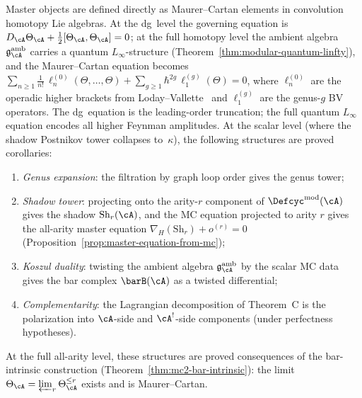 \begin{remark}
\label{rem:chriss-ginzburg-philosophy}
Master objects are defined directly as
Maurer--Cartan elements in convolution homotopy Lie algebras.  At
the dg~level the governing equation is
$D_{\cA}\Theta_{\cA} + \tfrac12[\Theta_{\cA},\Theta_{\cA}] = 0$;
at the full homotopy level the ambient algebra
$\mathfrak{g}_\cA^{\mathrm{amb}}$ carries a quantum
$L_\infty$-structure
(Theorem~\ref{thm:modular-quantum-linfty}), and the
Maurer--Cartan equation becomes
$\sum_{n \geq 1}\tfrac{1}{n!}\,\ell_n^{(0)}(\Theta,\dots,\Theta)
+ \sum_{g \geq 1}\hbar^{2g}\,\ell_1^{(g)}(\Theta) = 0$,
where $\ell_n^{(0)}$ are the operadic higher brackets from
Loday--Vallette~\cite[Thm~10.3.8]{LV12} and $\ell_1^{(g)}$ are
the genus-$g$ BV operators.  The dg~equation is the leading-order
truncation; the full quantum $L_\infty$ equation encodes all
higher Feynman amplitudes.
At the scalar level (where the shadow Postnikov tower
collapses to~$\kappa$), the following structures are
proved corollaries:
\begin{enumerate}[label=\textup{(\roman*)}]
\item \emph{Genus expansion}: the filtration by graph loop order gives the genus tower;
\item \emph{Shadow tower}: projecting onto the arity-$r$ component of $\Defcyc^{\mathrm{mod}}(\cA)$ gives the shadow $\mathrm{Sh}_r(\cA)$, and the MC equation projected to arity $r$ gives the all-arity master equation $\nabla_H(\mathrm{Sh}_r) + o^{(r)} = 0$ (Proposition~\ref{prop:master-equation-from-mc});
\item \emph{Koszul duality}: twisting the ambient algebra $\mathfrak{g}^{\mathrm{amb}}_\cA$ by the scalar MC data gives the bar complex $\barB(\cA)$ as a twisted differential;
\item \emph{Complementarity}: the Lagrangian decomposition of Theorem~C is the polarization into $\cA$-side and $\cA^!$-side components (under perfectness hypotheses).
\end{enumerate}
At the full all-arity level, these structures are
proved consequences of the bar-intrinsic construction
(Theorem~\ref{thm:mc2-bar-intrinsic}): the limit
$\Theta_\cA = \varprojlim_r \Theta_\cA^{\leq r}$ exists
and is Maurer--Cartan.
\end{remark}


